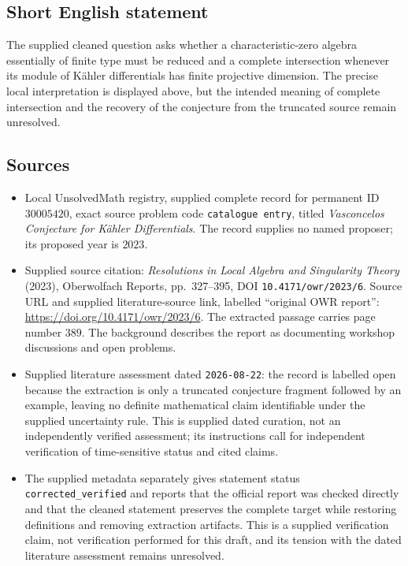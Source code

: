 \documentclass[11pt]{article}
\begin{document}
\subsection{Short English statement}
The supplied cleaned question asks whether a characteristic-zero algebra essentially of finite type must be reduced and a complete intersection whenever its module of K\"ahler differentials has finite projective dimension. The precise local interpretation is displayed above, but the intended meaning of complete intersection and the recovery of the conjecture from the truncated source remain unresolved.
\subsection{Sources}
\begin{itemize}
\item Local UnsolvedMath registry, supplied complete record for permanent ID \(30005420\), exact source problem code \texttt{catalogue entry}, titled \emph{Vasconcelos Conjecture for K\"ahler Differentials}. The record supplies no named proposer; its proposed year is \(2023\).
\item Supplied source citation: \emph{Resolutions in Local Algebra and Singularity Theory} (2023), Oberwolfach Reports, pp.\ 327--395, DOI \texttt{10.4171/owr/2023/6}. Source URL and supplied literature-source link, labelled ``original OWR report'': \url{https://doi.org/10.4171/owr/2023/6}. The extracted passage carries page number \(389\). The background describes the report as documenting workshop discussions and open problems.
\item Supplied literature assessment dated \texttt{2026-08-22}: the record is labelled open because the extraction is only a truncated conjecture fragment followed by an example, leaving no definite mathematical claim identifiable under the supplied uncertainty rule. This is supplied dated curation, not an independently verified assessment; its instructions call for independent verification of time-sensitive status and cited claims.
\item The supplied metadata separately gives statement status \texttt{corrected\_verified} and reports that the official report was checked directly and that the cleaned statement preserves the complete target while restoring definitions and removing extraction artifacts. This is a supplied verification claim, not verification performed for this draft, and its tension with the dated literature assessment remains unresolved.
\end{itemize}
\end{document}
